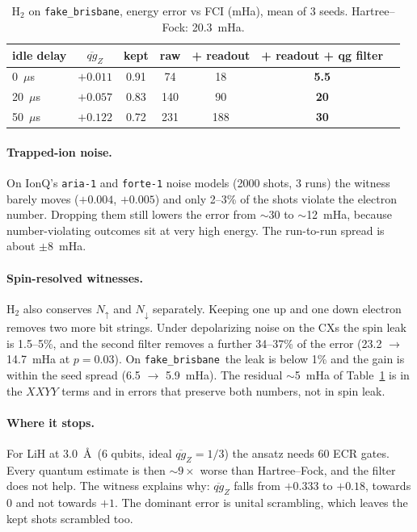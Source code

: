 \documentclass[11pt]{article}
\newcommand{\mqg}{\overline{qg}_Z}
\newcommand{\fb}{\texttt{fake\_brisbane}}
\begin{document}
\begin{table}[t]
\centering\small
\caption{H$_2$ on \fb, energy error vs FCI (mHa), mean of 3 seeds. Hartree--Fock: 20.3~mHa.}
\label{tab:h2}
\begin{tabular}{lcccccc}
\toprule
idle delay & $\mqg$ & kept & raw & + readout & + readout + qg filter \\
\midrule
0~$\mu$s & $+0.011$ & 0.91 & 74 & 18 & \textbf{5.5}\\
20~$\mu$s & $+0.057$ & 0.83 & 140 & 90 & \textbf{20}\\
50~$\mu$s & $+0.122$ & 0.72 & 231 & 188 & \textbf{30}\\
\bottomrule
\end{tabular}
\end{table}

\paragraph{Trapped-ion noise.} On IonQ's \texttt{aria-1} and \texttt{forte-1} noise models (2000
shots, 3 runs) the witness barely moves ($+0.004$, $+0.005$) and only 2--3\% of the shots violate
the electron number. Dropping them still lowers the error from $\sim$30 to $\sim$12~mHa, because
number-violating outcomes sit at very high energy. The run-to-run spread is about $\pm8$~mHa.

\paragraph{Spin-resolved witnesses.} H$_2$ also conserves $N_\uparrow$ and $N_\downarrow$
separately. Keeping one up and one down electron removes two more bit strings. Under depolarizing
noise on the CXs the spin leak is 1.5--5\%, and the second filter removes a further 34--37\% of the
error (23.2 $\to$ 14.7~mHa at $p=0.03$). On \fb\ the leak is below 1\% and the gain is within the
seed spread (6.5 $\to$ 5.9~mHa). The residual $\sim$5~mHa of Table~\ref{tab:h2} is in the $XXYY$
terms and in errors that preserve both numbers, not in spin leak.

\paragraph{Where it stops.} For LiH at 3.0~\AA\ (6 qubits, ideal $\mqg=1/3$) the ansatz needs 60 ECR
gates. Every quantum estimate is then $\sim9\times$ worse than Hartree--Fock, and the filter does not
help. The witness explains why: $\mqg$ falls from $+0.333$ to $+0.18$, towards 0 and not towards
$+1$. The dominant error is unital scrambling, which leaves the kept shots scrambled too.
\end{document}
